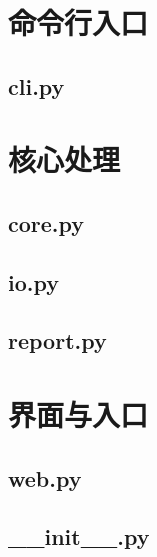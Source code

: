 %
%

\section{命令行入口}
\subsection{cli.py}


\section{核心处理}
\subsection{core.py}


\subsection{io.py}


\subsection{report.py}


\section{界面与入口}
\subsection{web.py}


\subsection{\_\_init\_\_.py}

